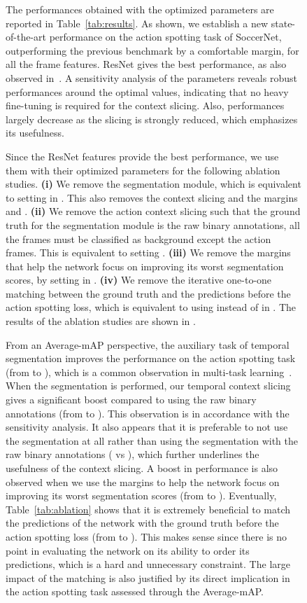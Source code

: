 \documentclass[10pt,twocolumn,letterpaper]{article}
\begin{document}
\begin{figure}[t]
{\begin{minipage}{\linewidth}
The performances obtained with the optimized parameters are reported in Table~\ref{tab:results}. As shown, we establish a new state-of-the-art performance on the action spotting task of SoccerNet, outperforming the previous benchmark by a comfortable margin, for all the frame features. ResNet gives the best performance, as also observed in~\cite{Giancola_2018_CVPR_Workshops}. A sensitivity analysis of the parameters  reveals robust performances around the optimal values, indicating that no heavy fine-tuning is required for the context slicing. Also, performances largely decrease as the slicing is strongly reduced, which emphasizes its usefulness. 


Since the ResNet features provide the best performance, we use them with their optimized parameters for the following ablation studies. \textbf{(i)} We remove the segmentation module, which is equivalent to setting  in . This also removes the context slicing and the margins  and . \textbf{(ii)} We remove the action context slicing such that the ground truth for the segmentation module is the raw binary annotations, \ie all the frames must be classified as background except the action frames. This is equivalent to setting . \textbf{(iii)} We remove the margins that help the network focus on improving its worst segmentation scores, by setting  in . \textbf{(iv)} We remove the iterative one-to-one matching between the ground truth  and the predictions  before the action spotting loss, which is equivalent to using  instead of  in . The results of the ablation studies are shown in .


From an Average-mAP perspective, the auxiliary task of temporal segmentation improves the performance on the action spotting task (from  to ), which is a common observation in multi-task learning~\cite{Zamir_2018_CVPR}. When the segmentation is performed, our temporal context slicing gives a significant boost compared to using the raw binary annotations (from  to ). This observation is in accordance with the sensitivity analysis. It also appears that it is preferable to not use the segmentation at all rather than using the segmentation with the raw binary annotations ( vs ), which further underlines the usefulness of the context slicing. A boost in performance is also observed when we use the margins to help the network focus on improving its worst segmentation scores (from  to ). Eventually, Table~\ref{tab:ablation} shows that it is extremely beneficial to match the predictions of the network with the ground truth before the action spotting loss (from  to ). This makes sense since there is no point in evaluating the network on its ability to order its predictions, which is a hard and unnecessary constraint. The large impact of the matching is also justified by its direct implication in the action spotting task assessed through the Average-mAP.



\end{minipage}}
\end{figure}
\end{document}
